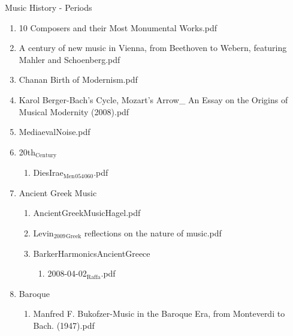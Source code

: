 \documentclass[11pt]{article}
\begin{document}
\item Music History - Periods
\label{sec-1-1-1-1-31-11}
\begin{enumerate}
\item 10 Composers and their Most Monumental Works.pdf
\label{sec-1-1-1-1-31-11-1}

\item A century of new music in Vienna, from Beethoven to Webern, featuring Mahler and Schoenberg.pdf
\label{sec-1-1-1-1-31-11-2}

\item Chanan Birth of Modernism.pdf
\label{sec-1-1-1-1-31-11-3}

\item Karol Berger-Bach's Cycle, Mozart's Arrow\_ An Essay on the Origins of Musical Modernity (2008).pdf
\label{sec-1-1-1-1-31-11-4}

\item MediaevalNoise.pdf
\label{sec-1-1-1-1-31-11-5}

\item 20th$_{\text{Century}}$
\label{sec-1-1-1-1-31-11-6}
\begin{enumerate}
\item DiesIrae$_{\text{Men}}$$_{\text{054}}$$_{\text{060}}$.pdf
\label{sec-1-1-1-1-31-11-6-1}
\end{enumerate}

\item Ancient Greek Music
\label{sec-1-1-1-1-31-11-7}
\begin{enumerate}
\item AncientGreekMusicHagel.pdf
\label{sec-1-1-1-1-31-11-7-1}

\item Levin$_{\text{2009}}$$_{\text{Greek}}$ reflections on the nature of music.pdf
\label{sec-1-1-1-1-31-11-7-2}

\item BarkerHarmonicsAncientGreece
\label{sec-1-1-1-1-31-11-7-3}
\begin{enumerate}
\item 2008-04-02$_{\text{Raffa}}$.pdf
\label{sec-1-1-1-1-31-11-7-3-1}
\end{enumerate}
\end{enumerate}

\item Baroque
\label{sec-1-1-1-1-31-11-8}
\begin{enumerate}
\item Manfred F. Bukofzer-Music in the Baroque Era, from Monteverdi to Bach. (1947).pdf
\label{sec-1-1-1-1-31-11-8-1}
\end{enumerate}


\end{enumerate}
\end{document}
